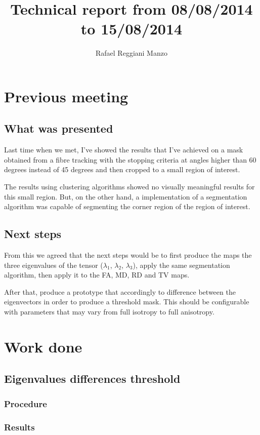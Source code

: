 \documentclass[a4paper,11pt]{report}
\title{Technical report from 08/08/2014 to 15/08/2014}
\author{Rafael Reggiani Manzo}
\begin{document}
\maketitle
\tableofcontents

\chapter{Previous meeting}
  \section{What was presented}
  Last time when we met, I've showed the results that I've achieved on a mask obtained from a fibre tracking with the stopping criteria at angles higher than 60 degrees instead of 45 degrees and then cropped to a small region of interest.

  The results using clustering algorithms showed no visually meaningful results for this small region. But, on the other hand, a implementation of a segmentation algorithm was capable of segmenting the corner region of the region of interest.

  \section{Next steps}
  From this we agreed that the next steps would be to first produce the maps the three eigenvalues of the tensor ($\lambda_1$, $\lambda_2$, $\lambda_3$), apply the same segmentation algorithm, then apply it to the FA, MD, RD and TV maps.

  After that, produce a prototype that accordingly to difference between the eigenvectors in order to produce a threshold mask. This should be configurable with parameters that may vary from full isotropy to full anisotropy.

\chapter{Work done}
  \section{Eigenvalues differences threshold}
    \subsection{Procedure}
    \subsection{Results}
\end{document}
